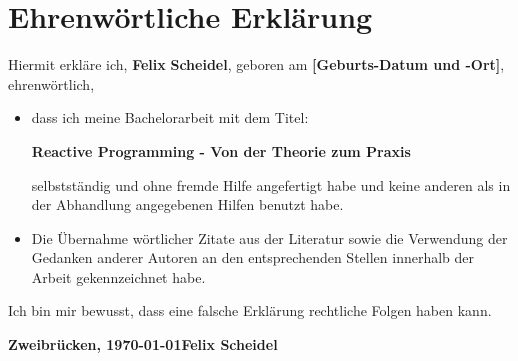 \chapter*{Ehrenw\"ortliche Erkl\"arung}
Hiermit erkl\"are ich, \textbf{Felix} \textbf{Scheidel}, geboren am
\textbf{[Geburts-Datum und -Ort]}, ehrenw\"ortlich,
\begin{itemize}
\item dass ich meine Bachelorarbeit mit dem Titel:

\textbf{Reactive Programming - Von der Theorie zum Praxis}

selbstst\"andig und ohne fremde Hilfe angefertigt habe und keine anderen als in der
Abhandlung angegebenen Hilfen benutzt habe.
\item Die \"Ubernahme w\"ortlicher Zitate aus der Literatur
sowie die Verwendung der Gedanken anderer Autoren an den entsprechenden
Stellen innerhalb der Arbeit gekennzeichnet habe.
\end{itemize}
Ich bin mir bewusst, dass eine falsche Erkl\"arung rechtliche Folgen haben kann.
\vspace*{3cm}

\textbf{Zweibr\"ucken, \today}\hfill\textbf{Felix Scheidel}
